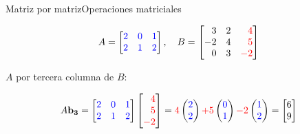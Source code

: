 \documentclass[spanish, c]{beamer}
\begin{document}
\begin{frame}{Matriz por matriz}{Operaciones matriciales}
    
    \[%
        A = %
        \begin{bmatrix*}[r]
            \color{blue} 2 & \color{blue} 0 & \color{blue} 1 \\
            \color{blue} 2 & \color{blue} 1 & \color{blue} 2
        \end{bmatrix*}, \quad
        B = %
        \begin{bmatrix*}[r]
            3 & 2 & \color{red} 4 \\
            -2 & 4 & \color{red} 5 \\
            0 & 3 & \color{red} -2
        \end{bmatrix*}
    \]

    \bigskip

    $A$ por tercera columna de $B$:

    \[A\mathbf{b_3} =
        \begin{bmatrix*}[r]
            \color{blue} 2 & \color{blue} 0 & \color{blue} 1 \\
            \color{blue} 2 & \color{blue} 1 & \color{blue} 2
        \end{bmatrix*}
        \begin{bmatrix*}[r]
            \color{red} 4 \\ \color{red} 5 \\ \color{red} -2
        \end{bmatrix*}
        = {\color{red} 4} %
        \begin{pmatrix*}[r]
            \color{blue} 2 \\ \color{blue} 2
        \end{pmatrix*}
        {\color{red} + 5} %
        \begin{pmatrix*}[r]
            \color{blue} 0 \\ \color{blue} 1
        \end{pmatrix*}
        {\color{red} -2} %
        \begin{pmatrix*}[r]
            \color{blue} 1 \\ \color{blue} 2
        \end{pmatrix*}
        = %
        \begin{bmatrix*}[r]
            6 \\ 9
        \end{bmatrix*}
    \]
\end{frame}
\end{document}
